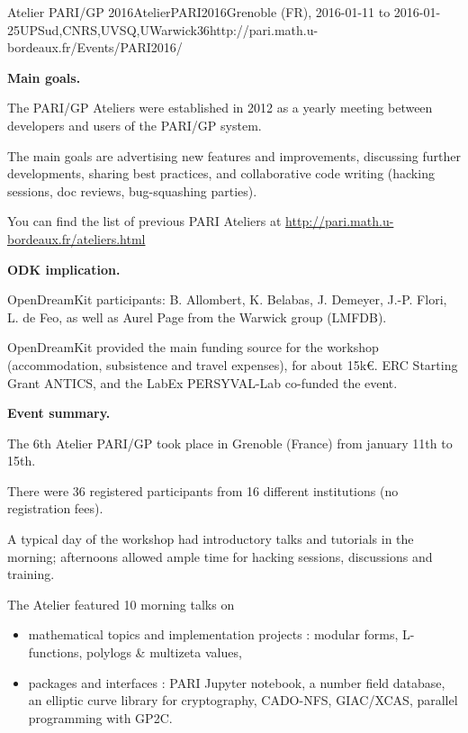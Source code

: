 \begin{event}{Atelier PARI/GP 2016}{AtelierPARI2016}{Grenoble (FR),
2016-01-11 to 2016-01-25}{UPSud,CNRS,UVSQ,UWarwick}{36}{http://pari.math.u-bordeaux.fr/Events/PARI2016/}

\textbf{Main goals.}

The PARI/GP Ateliers were established in 2012 as a yearly meeting
between developers and users of the PARI/GP system.

The main goals are advertising new features and improvements,
discussing further developments, sharing best practices, and collaborative
code writing (hacking sessions, doc reviews, bug-squashing parties).

You can find the list of previous PARI Ateliers at
\url{http://pari.math.u-bordeaux.fr/ateliers.html}

\textbf{ODK implication.} 

OpenDreamKit participants: B. Allombert, K. Belabas, J. Demeyer, J.-P. Flori,
L. de Feo, as well as Aurel Page from the Warwick group (LMFDB).

OpenDreamKit provided the main funding source for the workshop (accommodation,
subsistence and travel expenses), for about 15k\euro. ERC Starting Grant
ANTICS, and the LabEx PERSYVAL-Lab co-funded the event.

\textbf{Event summary.} 

The 6th Atelier PARI/GP took place in Grenoble (France) from january
11th to 15th.

There were 36 registered participants from 16 different institutions
(no registration fees).

A typical day of the workshop had introductory talks and tutorials
in the morning; afternoons allowed ample time for hacking sessions,
discussions and training.

The Atelier featured 10 morning talks on

\begin{itemize}
\item mathematical topics and implementation projects : modular forms,
    L-functions, polylogs \& multizeta values,

\item packages and interfaces : PARI Jupyter notebook, a number field database,
    an elliptic curve library for cryptography, CADO-NFS, GIAC/XCAS,
    parallel programming with GP2C.
\end{itemize}


\end{event}
